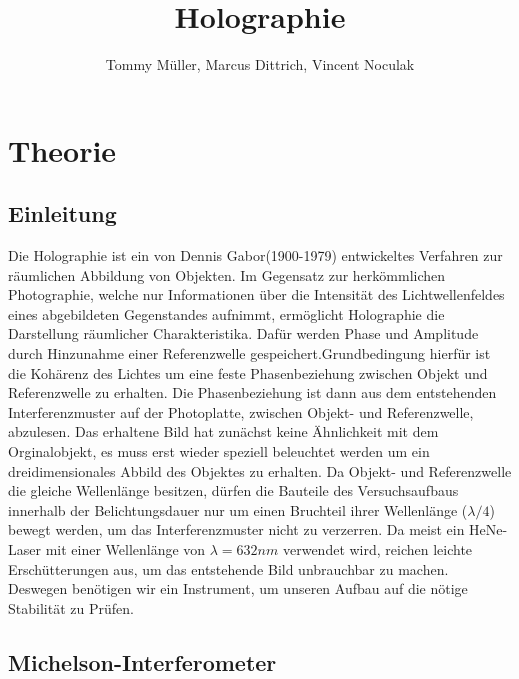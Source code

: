 \documentclass[12pt,a4paper]{article}
\author{Tommy Müller, Marcus Dittrich, Vincent Noculak}
\title{Holographie}
\begin{document}
\maketitle
\newpage
\tableofcontents
\newpage
	
\section{Theorie}

\subsection{Einleitung}

Die Holographie ist ein von Dennis Gabor(1900-1979) entwickeltes Verfahren zur räumlichen Abbildung von Objekten. Im Gegensatz zur herkömmlichen Photographie, welche nur Informationen über die Intensität des Lichtwellenfeldes eines abgebildeten Gegenstandes aufnimmt, ermöglicht Holographie die Darstellung räumlicher Charakteristika. Dafür werden Phase und Amplitude durch Hinzunahme einer Referenzwelle gespeichert.Grundbedingung hierfür ist die Kohärenz des Lichtes um eine feste Phasenbeziehung zwischen Objekt und Referenzwelle zu erhalten. Die Phasenbeziehung ist dann aus dem entstehenden Interferenzmuster auf der Photoplatte, zwischen Objekt- und Referenzwelle, abzulesen. Das erhaltene Bild hat zunächst keine Ähnlichkeit mit dem Orginalobjekt, es muss erst wieder speziell beleuchtet werden um ein dreidimensionales Abbild des Objektes zu erhalten. Da Objekt- und Referenzwelle die gleiche Wellenlänge besitzen, dürfen die Bauteile des Versuchsaufbaus innerhalb der Belichtungsdauer nur um einen Bruchteil ihrer Wellenlänge ($\lambda/4$) bewegt werden, um das Interferenzmuster nicht zu verzerren. Da meist ein HeNe-Laser mit einer Wellenlänge von $\lambda = 632nm$ verwendet wird, reichen leichte Erschütterungen aus, um das entstehende Bild unbrauchbar zu machen. Deswegen benötigen wir ein Instrument, um unseren Aufbau auf die nötige Stabilität zu Prüfen. 

\subsection{Michelson-Interferometer}
\end{document}
